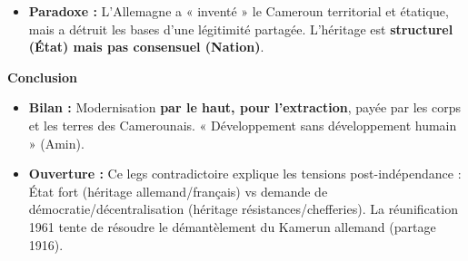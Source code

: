 \documentclass[11pt]{article}
\begin{document}
\begin{exoresolu}
\begin{itemize}
    \item \textbf{Paradoxe :} L'Allemagne a « inventé » le Cameroun territorial et étatique, mais a détruit les bases d'une légitimité partagée. L'héritage est \textbf{structurel (État) mais pas consensuel (Nation)}.
\end{itemize}
\textbf{Conclusion}
\begin{itemize}
    \item \textbf{Bilan :} Modernisation \textbf{par le haut, pour l'extraction}, payée par les corps et les terres des Camerounais. « Développement sans développement humain » (Amin).
    \item \textbf{Ouverture :} Ce legs contradictoire explique les tensions post-indépendance : État fort (héritage allemand/français) vs demande de démocratie/décentralisation (héritage résistances/chefferies). La réunification 1961 tente de résoudre le démantèlement du Kamerun allemand (partage 1916).
\end{itemize}
\end{exoresolu}
\end{document}
